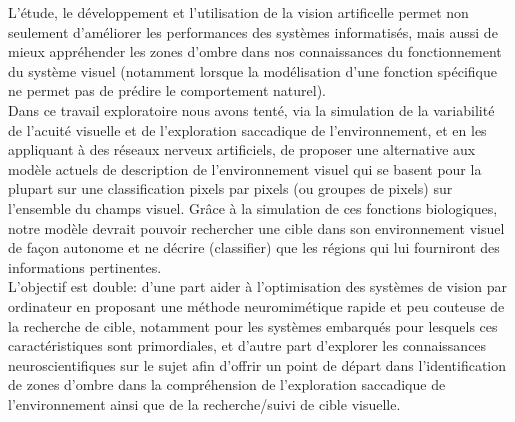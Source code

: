 L'étude, le développement et l'utilisation de la vision artificelle permet non seulement d'améliorer les performances des systèmes informatisés, mais aussi de mieux appréhender les zones d'ombre dans nos connaissances du fonctionnement du système visuel (notamment lorsque la modélisation d'une fonction spécifique ne permet pas de prédire le comportement naturel). \autocite{Werner2014} \\

Dans ce travail exploratoire nous avons tenté, via la simulation de la variabilité de l'acuité visuelle et de l'exploration saccadique de l'environnement, et en les appliquant à des réseaux nerveux artificiels, de proposer une alternative aux modèle actuels de description de l'environnement visuel qui se basent pour la plupart sur une classification pixels par pixels (ou groupes de pixels) sur l'ensemble du champs visuel. 
Grâce à la simulation de ces fonctions biologiques, notre modèle devrait pouvoir rechercher une cible dans son environnement visuel de façon autonome et ne décrire (classifier) que les régions qui lui fourniront des informations pertinentes. \\
L'objectif est double: d'une part aider à l'optimisation des systèmes de vision par ordinateur en proposant une méthode neuromimétique rapide et peu couteuse de la recherche de cible, notamment pour les systèmes embarqués pour lesquels ces caractéristiques sont primordiales, et d'autre part d'explorer les connaissances neuroscientifiques sur le sujet afin d'offrir un point de départ dans l'identification de zones d'ombre dans la compréhension de l'exploration saccadique de l'environnement ainsi que de la recherche/suivi de cible visuelle.